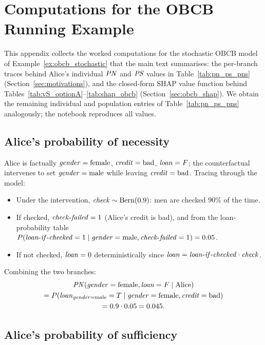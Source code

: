 \section{Computations for the OBCB Running Example}\label{app:obcb}

This appendix collects the worked computations for the stochastic OBCB model of
Example~\ref{ex:obcb_stochastic} that the main text summarises: the
per-branch traces behind Alice's individual $\mathit{PN}$ and $\mathit{PS}$ values in
Table~\ref{tab:pn_ps_pns} (Section~\ref{sec:motivations}), and the closed-form
SHAP value function behind Tables~\ref{tab:vS_optionA}--\ref{tab:shap_obcb}
(Section~\ref{sec:obcb_shap}). We obtain the remaining individual and population
entries of Table~\ref{tab:pn_ps_pns} analogously; the notebook
 reproduces all values.

\subsection{Alice's probability of necessity}\label{app:obcb_pn}

Alice is factually $\varname{gender}=\text{female}$, $\varname{credit}=\text{bad}$,
$\varname{loan}=F$; the counterfactual intervenes to set
$\varname{gender}=\text{male}$ while leaving $\varname{credit}=\text{bad}$.
Tracing through the model:
\begin{itemize}
\item Under the intervention, $\varname{check}\sim\mathrm{Bern}(0.9)$: men are
checked $90\%$ of the time.
\item If checked, $\varname{check\text{-}failed}=1$ (Alice's credit is bad), and from
the loan-probability table
$P(\varname{loan\text{-}if\text{-}checked}=1\mid\varname{gender}=\text{male},\varname{check\text{-}failed}=1)=0.05$.
\item If not checked, $\varname{loan}=0$ deterministically since
$\varname{loan}=\varname{loan\text{-}if\text{-}checked}\cdot\varname{check}$.
\end{itemize}
Combining the two branches:
\begin{multline*}
\pn(\varname{gender}=\text{female}, \varname{loan}=F \mid \text{Alice}) \\
= P(\varname{loan}_{\varname{gender}=\text{male}}=T
\mid \varname{gender}=\text{female}, \varname{credit}=\text{bad}) \\
= 0.9 \cdot 0.05 = 0.045.
\end{multline*}

\subsection{Alice's probability of sufficiency}\label{app:obcb_ps}

